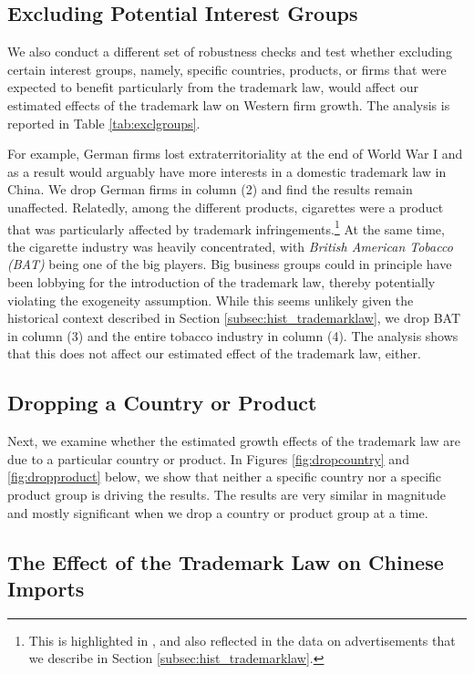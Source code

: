 \documentclass[12pt]{article}
\begin{document}
\subsection{Excluding Potential Interest Groups}

We also conduct a different set of robustness checks and test whether excluding certain interest groups, namely, specific countries, products, or firms that were expected to benefit particularly from the trademark law, would affect our estimated effects of the trademark law on Western firm growth. The analysis is reported in Table \ref{tab:exclgroups}. 

For example,  German firms lost extraterritoriality at the end of World War I and as a result would arguably have more interests in a domestic trademark law in China. We drop German firms in column (2) and find the results remain unaffected. Relatedly, among the different products, cigarettes were a product that was particularly affected by trademark infringements.\footnote{This is highlighted in \cite{Motono2011}, and also reflected in the data on advertisements that we describe in Section \ref{subsec:hist_trademarklaw}.} At the same time, the cigarette industry was heavily concentrated, with \emph{British American Tobacco (BAT)} being one of the big players. Big business groups could in principle have been lobbying for the introduction of the trademark law, thereby potentially violating the exogeneity assumption. While this seems unlikely given the historical context described in Section \ref{subsec:hist_trademarklaw}, we drop BAT in column (3) and the entire tobacco industry in column (4). The analysis shows that this does not affect our estimated effect of the trademark law, either.

\subsection{Dropping a Country or Product}

Next, we examine whether the estimated growth effects of the trademark law are due to a particular country or product. In Figures \ref{fig:dropcountry} and \ref{fig:dropproduct} below, we show that neither a specific country nor a specific product group is driving the results. The results are very similar in magnitude and mostly significant when we drop a country or product group at a time.

\subsection{The Effect of the Trademark Law on Chinese Imports} \label{subsec:trade}
\end{document}
